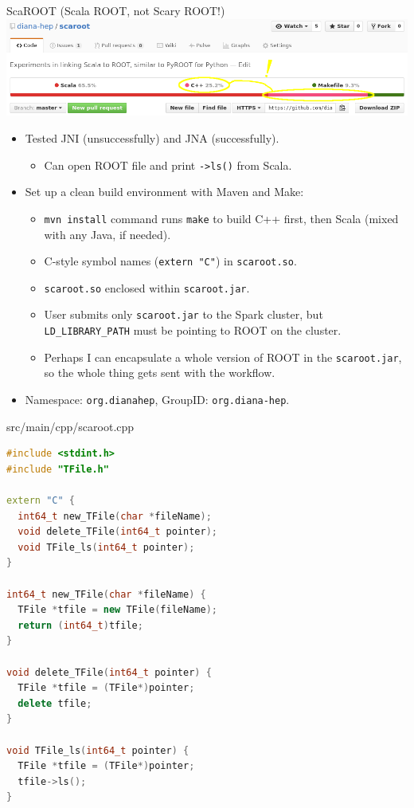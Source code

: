 \documentclass{beamer}
\begin{document}
\begin{frame}{ScaROOT {\small (Scala ROOT, not Scary ROOT!)}}
\includegraphics[width=\linewidth]{scaroot_languages.png}

\vspace{0.2 cm}
\begin{itemize}
\item Tested JNI (unsuccessfully) and JNA (successfully).
\begin{itemize}
\item Can open ROOT file and print {\tt ->ls()} from Scala.
\end{itemize}
\item Set up a clean build environment with Maven and Make:
\begin{itemize}
\item {\tt mvn install} command runs {\tt make} to build C++ first, then Scala (mixed with any Java, if needed).
\item C-style symbol names ({\tt extern "C"}) in {\tt scaroot.so}.
\item {\tt scaroot.so} enclosed within {\tt scaroot.jar}.
\item User submits only {\tt scaroot.jar} to the Spark cluster, but {\tt LD\_LIBRARY\_PATH} must be pointing to ROOT on the cluster.
\item Perhaps I can encapsulate a whole version of ROOT in the {\tt scaroot.jar}, so the whole thing gets sent with the workflow.
\end{itemize}
\item Namespace: {\tt org.dianahep}, GroupID: {\tt org.diana-hep}.
\end{itemize}
\end{frame}

\begin{frame}[fragile]{src/main/cpp/scaroot.cpp}
\begin{lstlisting}[language=c++]
#include <stdint.h>
#include "TFile.h"

extern "C" {
  int64_t new_TFile(char *fileName);
  void delete_TFile(int64_t pointer);
  void TFile_ls(int64_t pointer);
}

int64_t new_TFile(char *fileName) {
  TFile *tfile = new TFile(fileName);
  return (int64_t)tfile;
}

void delete_TFile(int64_t pointer) {
  TFile *tfile = (TFile*)pointer;
  delete tfile;
}

void TFile_ls(int64_t pointer) {
  TFile *tfile = (TFile*)pointer;
  tfile->ls();
}
\end{lstlisting}
\end{frame}
\end{document}
